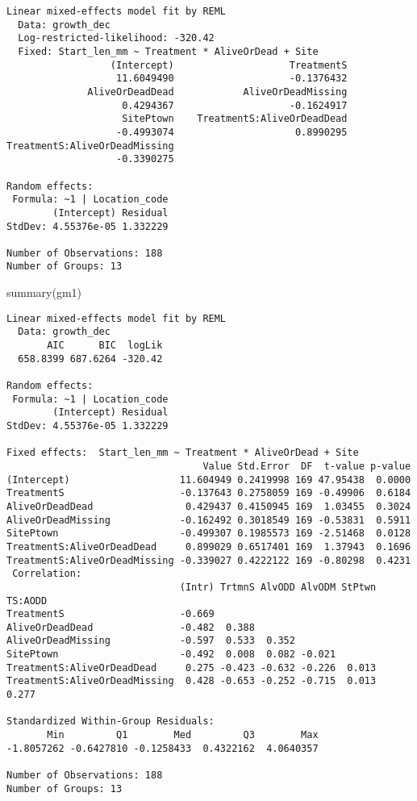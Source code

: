 \documentclass[
  letterpaper,
  DIV=11,
  numbers=noendperiod]{scrartcl}
\newenvironment{Shaded}{\begin{snugshade}}{\end{snugshade}}
\newcommand{\FunctionTok}[1]{\textcolor[rgb]{0.28,0.35,0.67}{#1}}
\newcommand{\NormalTok}[1]{\textcolor[rgb]{0.00,0.23,0.31}{#1}}
\begin{document}
\begin{verbatim}
Linear mixed-effects model fit by REML
  Data: growth_dec 
  Log-restricted-likelihood: -320.42
  Fixed: Start_len_mm ~ Treatment * AliveOrDead + Site 
                  (Intercept)                    TreatmentS 
                   11.6049490                    -0.1376432 
              AliveOrDeadDead            AliveOrDeadMissing 
                    0.4294367                    -0.1624917 
                    SitePtown    TreatmentS:AliveOrDeadDead 
                   -0.4993074                     0.8990295 
TreatmentS:AliveOrDeadMissing 
                   -0.3390275 

Random effects:
 Formula: ~1 | Location_code
        (Intercept) Residual
StdDev: 4.55376e-05 1.332229

Number of Observations: 188
Number of Groups: 13 
\end{verbatim}

\begin{Shaded}
\begin{Highlighting}[]
\FunctionTok{summary}\NormalTok{(gm1)}
\end{Highlighting}
\end{Shaded}

\begin{verbatim}
Linear mixed-effects model fit by REML
  Data: growth_dec 
       AIC      BIC  logLik
  658.8399 687.6264 -320.42

Random effects:
 Formula: ~1 | Location_code
        (Intercept) Residual
StdDev: 4.55376e-05 1.332229

Fixed effects:  Start_len_mm ~ Treatment * AliveOrDead + Site 
                                  Value Std.Error  DF  t-value p-value
(Intercept)                   11.604949 0.2419998 169 47.95438  0.0000
TreatmentS                    -0.137643 0.2758059 169 -0.49906  0.6184
AliveOrDeadDead                0.429437 0.4150945 169  1.03455  0.3024
AliveOrDeadMissing            -0.162492 0.3018549 169 -0.53831  0.5911
SitePtown                     -0.499307 0.1985573 169 -2.51468  0.0128
TreatmentS:AliveOrDeadDead     0.899029 0.6517401 169  1.37943  0.1696
TreatmentS:AliveOrDeadMissing -0.339027 0.4222122 169 -0.80298  0.4231
 Correlation: 
                              (Intr) TrtmnS AlvODD AlvODM StPtwn TS:AODD
TreatmentS                    -0.669                                    
AliveOrDeadDead               -0.482  0.388                             
AliveOrDeadMissing            -0.597  0.533  0.352                      
SitePtown                     -0.492  0.008  0.082 -0.021               
TreatmentS:AliveOrDeadDead     0.275 -0.423 -0.632 -0.226  0.013        
TreatmentS:AliveOrDeadMissing  0.428 -0.653 -0.252 -0.715  0.013  0.277 

Standardized Within-Group Residuals:
       Min         Q1        Med         Q3        Max 
-1.8057262 -0.6427810 -0.1258433  0.4322162  4.0640357 

Number of Observations: 188
Number of Groups: 13 
\end{verbatim}
\end{document}
